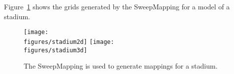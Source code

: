 Figure~\ref{fig:stadium} shows the grids generated by the SweepMapping for a model of a stadium.
\begin{figure}
\begin{center}
  \texttt{[image: \\figures/stadium2d]}
  \texttt{[image: \\figures/stadium3d]}
\end{center}
\caption{The SweepMapping is used to generate mappings for a stadium.}\label{fig:stadium}
\end{figure}


